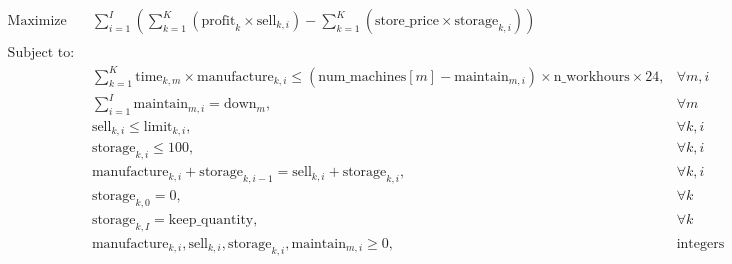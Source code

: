 \documentclass{article}
\begin{document}
\begin{align*}
\text{Maximize} \quad & \sum_{i=1}^{I} \left( \sum_{k=1}^{K} \left( \text{profit}_k \times \text{sell}_{k,i} \right) - \sum_{k=1}^{K} \left( \text{store\_price} \times \text{storage}_{k,i} \right) \right) \\\\
\text{Subject to:} \quad & \\
& \sum_{k=1}^{K} \text{time}_{k,m} \times \text{manufacture}_{k,i} \leq \left(\text{num\_machines}[m] - \text{maintain}_{m,i}\right) \times \text{n\_workhours} \times 24, & \forall m, i \\
& \sum_{i=1}^{I} \text{maintain}_{m,i} = \text{down}_{m}, & \forall m \\
& \text{sell}_{k,i} \leq \text{limit}_{k,i}, & \forall k, i \\
& \text{storage}_{k,i} \leq 100, & \forall k, i \\
& \text{manufacture}_{k,i} + \text{storage}_{k,i-1} = \text{sell}_{k,i} + \text{storage}_{k,i}, & \forall k, i \\
& \text{storage}_{k,0} = 0, & \forall k \\
& \text{storage}_{k,I} = \text{keep\_quantity}, & \forall k \\
& \text{manufacture}_{k,i}, \text{sell}_{k,i}, \text{storage}_{k,i}, \text{maintain}_{m,i} \geq 0, & \text{integers}
\end{align*}
\end{document}
